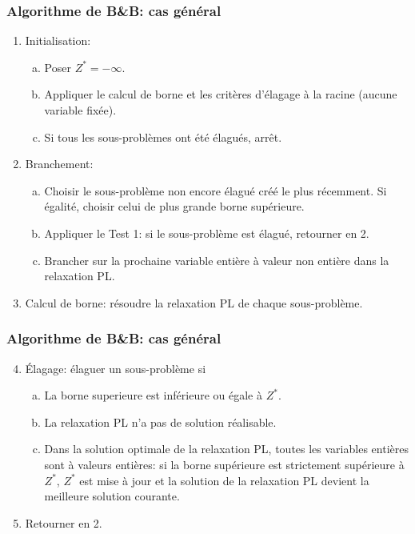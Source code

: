 \documentclass[usepdftitle=false]{beamer}
\begin{document}
\begin{frame}
\frametitle{Algorithme de B\&B: cas général}

\begin{enumerate}
\item
Initialisation:
\begin{enumerate}[(a)]
\item
Poser $Z^* = -\infty$.
\item
Appliquer le calcul de borne et les critères d'élagage à la racine (aucune variable fixée).
\item
Si tous les sous-problèmes ont été élagués, arrêt.
\end{enumerate}
\item
Branchement:
\begin{enumerate}[(a)]
\item
Choisir le sous-problème non encore élagué créé le plus récemment. Si égalité, choisir celui de plus grande borne supérieure.
\item
Appliquer le Test 1: si le sous-problème est élagué, retourner en 2.
\item
Brancher sur la prochaine variable entière à valeur non entière dans la relaxation PL.
\end{enumerate}
\item
Calcul de borne: résoudre la relaxation PL de chaque sous-problème.
\end{enumerate}

\end{frame}

\begin{frame}
\frametitle{Algorithme de B\&B: cas général}

\begin{enumerate}
\setcounter{enumi}{3}
\item
Élagage: élaguer un sous-problème si
\begin{enumerate}[(a)]
\item
La borne superieure est inférieure ou égale à $Z^*$.
\item
La relaxation PL n'a pas de solution réalisable.
\item
Dans la solution optimale de la relaxation PL, toutes les variables entières sont à valeurs entières: si la borne
supérieure est strictement supérieure à $Z^*$, $Z^*$ est mise à jour et la solution de la relaxation PL devient la meilleure solution courante.
\end{enumerate}
\item
Retourner en 2.
\end{enumerate}

\end{frame}
\end{document}
